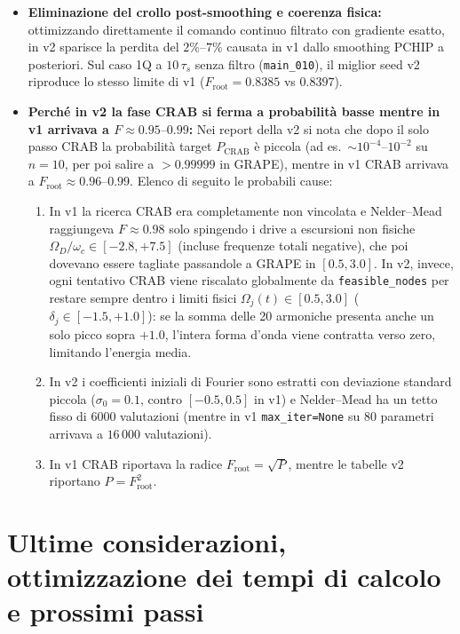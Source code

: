 \documentclass[11pt,a4paper]{article}
\begin{document}
\begin{itemize}
    \item \textbf{Eliminazione del crollo post-smoothing e coerenza fisica:} ottimizzando direttamente il comando continuo filtrato con gradiente esatto, in v2 sparisce la perdita del $2\%\text{--}7\%$ causata in v1 dallo smoothing PCHIP a posteriori. Sul caso 1Q a $10\,\tau_s$ senza filtro (\texttt{main\_010}), il miglior seed v2 riproduce lo stesso limite di v1 ($F_{\text{root}} = 0.8385$ vs $0.8397$).
    \item \textbf{Perché in v2 la fase CRAB si ferma a probabilità basse mentre in v1 arrivava a $F \approx 0.95\text{--}0.99$:}
    Nei report della v2 si nota che dopo il solo passo CRAB la probabilità target $P_{\text{CRAB}}$ è piccola (ad es.\ $\sim 10^{-4}\text{--}10^{-2}$ su $n=10$, per poi salire a $>0.99999$ in GRAPE), mentre in v1 CRAB arrivava a $F_{\text{root}} \approx 0.96\text{--}0.99$. Elenco di seguito le probabili cause:
    \begin{enumerate}
        \item In v1 la ricerca CRAB era completamente non vincolata e Nelder--Mead raggiungeva $F \approx 0.98$ solo spingendo i drive a escursioni non fisiche $\Omega_D/\omega_c \in [-2.8, +7.5]$ (incluse frequenze totali negative), che poi dovevano essere tagliate passandole a GRAPE in $[0.5, 3.0]$. In v2, invece, ogni tentativo CRAB viene riscalato globalmente da \texttt{feasible\_nodes} per restare sempre dentro i limiti fisici $\Omega_j(t) \in [0.5, 3.0]$ ($\delta_j \in [-1.5, +1.0]$): se la somma delle 20 armoniche presenta anche un solo picco sopra $+1.0$, l'intera forma d'onda viene contratta verso zero, limitando l'energia media.
        \item In v2 i coefficienti iniziali di Fourier sono estratti con deviazione standard piccola ($\sigma_0 = 0.1$, contro $[-0.5, 0.5]$ in v1) e Nelder--Mead ha un tetto fisso di $6000$ valutazioni (mentre in v1 \texttt{max\_iter=None} su 80 parametri arrivava a $16\,000$ valutazioni).
        \item In v1 CRAB riportava la radice $F_{\text{root}} = \sqrt{P}$, mentre le tabelle v2 riportano $P = F_{\text{root}}^2$.
    \end{enumerate}
\end{itemize}

\section{Ultime considerazioni, ottimizzazione dei tempi di calcolo e prossimi passi}
\end{document}
